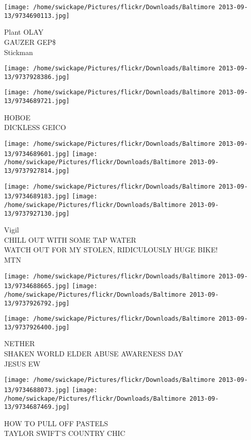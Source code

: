 \documentclass[10pt,letterpaper]{article}
\begin{document}
\texttt{[image: /home/swickape/Pictures/flickr/Downloads/Baltimore 2013-09-13/9734690113.jpg]}

Plant OLAY\\
GAUZER GEP\$\\
Stickman\\
\pagebreak

\texttt{[image: /home/swickape/Pictures/flickr/Downloads/Baltimore 2013-09-13/9737928386.jpg]}

\vspace{0.25in}
\texttt{[image: /home/swickape/Pictures/flickr/Downloads/Baltimore 2013-09-13/9734689721.jpg]}

HOBOE\\
DICKLESS GEICO\\
\pagebreak

\texttt{[image: /home/swickape/Pictures/flickr/Downloads/Baltimore 2013-09-13/9734689601.jpg]}
\texttt{[image: /home/swickape/Pictures/flickr/Downloads/Baltimore 2013-09-13/9737927814.jpg]}

\texttt{[image: /home/swickape/Pictures/flickr/Downloads/Baltimore 2013-09-13/9734689183.jpg]}
\texttt{[image: /home/swickape/Pictures/flickr/Downloads/Baltimore 2013-09-13/9737927130.jpg]}

Vigil\\
CHILL OUT WITH SOME TAP WATER\\
WATCH OUT FOR MY STOLEN, RIDICULOUSLY HUGE BIKE!\\
MTN\\
\pagebreak

\texttt{[image: /home/swickape/Pictures/flickr/Downloads/Baltimore 2013-09-13/9734688665.jpg]}
\texttt{[image: /home/swickape/Pictures/flickr/Downloads/Baltimore 2013-09-13/9737926792.jpg]}

\vspace{0.25in}
\texttt{[image: /home/swickape/Pictures/flickr/Downloads/Baltimore 2013-09-13/9737926400.jpg]}

NETHER\\
SHAKEN WORLD ELDER ABUSE AWARENESS DAY\\
JESUS EW\\
\pagebreak

\texttt{[image: /home/swickape/Pictures/flickr/Downloads/Baltimore 2013-09-13/9734688073.jpg]}
\texttt{[image: /home/swickape/Pictures/flickr/Downloads/Baltimore 2013-09-13/9734687469.jpg]}

HOW TO PULL OFF PASTELS\\
TAYLOR SWIFT'S COUNTRY CHIC\\
\pagebreak
\end{document}
